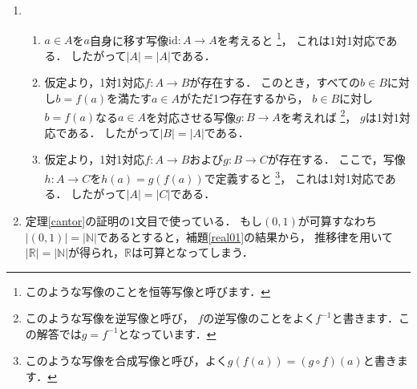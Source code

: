 ﻿\documentclass[./main]{subfiles} %
\theoremstyle{definition}
\begin{document}
\begin{enumerate}
\item
\begin{enumerate}
\item $a\in A$を$a$自身に移す写像$\mathrm{id}\colon A\to A$を考えると
\footnote{このような写像のことを恒等写像と呼びます．}，
これは1対1対応である．
したがって$|A|=|A|$である．
\item 仮定より，1対1対応$f\colon A\to B$が存在する．
このとき，すべての$b\in B$に対し$b=f(a)$を満たす$a\in A$がただ1つ存在するから，
$b\in B$に対し$b=f(a)$なる$a\in A$を対応させる写像$g\colon B\to A$を考えれば
\footnote{このような写像を逆写像と呼び，
$f$の逆写像のことをよく$f^{-1}$と書きます．この解答では$g=f^{-1}$となっています．}，
$g$は1対1対応である．
したがって$|B|=|A|$である．
\item 仮定より，1対1対応$f\colon A\to B$および$g\colon B\to C$が存在する．
ここで，写像$h\colon A\to C$を$h(a)=g(f(a))$で定義すると
\footnote{このような写像を合成写像と呼び，よく$g(f(a))=(g\circ f)(a)$と書きます．}，
これは1対1対応である．
したがって$|A|=|C|$である．
\end{enumerate}
\item 定理\ref{cantor}の証明の1文目で使っている．
もし$(0,1)$が可算すなわち$|(0,1)|=|\mathbb{N}|$であるとすると，補題\ref{real01}の結果から，
推移律を用いて$|\mathbb{R}|=|\mathbb{N}|$が得られ，$\mathbb{R}$は可算となってしまう．
\end{enumerate}
\end{document}

